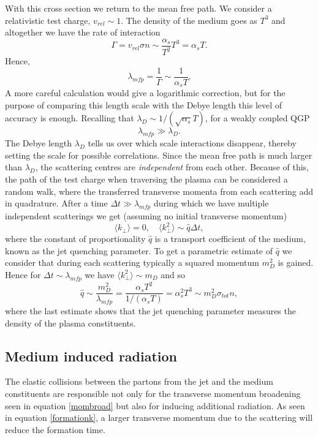 \documentclass[a4paper,12pt]{article}
\numberwithin{equation}{section}
\begin{document}
With this cross section we return to the mean free path. We consider a relativistic test charge, $v_{rel}\sim 1$. The density of the medium goes as $T^3$ and altogether we have the rate of interaction
\begin{equation}
\Gamma = v_{rel}\sigma n \sim \frac{\alpha_s}{T^2}T^3= \alpha_sT.
\end{equation}
Hence,
\begin{equation}
\lambda_{mfp}=\frac{1}{\Gamma}\sim \frac{1}{\alpha_sT}.
\end{equation}
A more careful calculation would give a logarithmic correction, but for the purpose of comparing this length scale with the Debye length this level of accuracy is enough. Recalling that $\lambda_D\sim 1/(\sqrt{\alpha_s}T)$, for a weakly coupled QGP
\begin{equation}
\lambda_{mfp}\gg\lambda_D.
\end{equation}
The Debye length $\lambda_D$ tells us over which scale interactions disappear, thereby setting the scale for possible correlations. Since the mean free path is much larger than $\lambda_D$, the scattering centres are \emph{independent} from each other. Because of this, the path of the test charge when traversing the plasma can be considered a random walk, where the transferred transverse momenta from each scattering add in quadrature. After a time $\Delta t \gg \lambda_{mfp}$ during which we have multiple independent scatterings we get (assuming no initial transverse momentum)
\begin{equation}\label{mombroad}
\langle k_\perp \rangle = 0, \quad \langle k_\perp^2 \rangle \sim \hat{q}\Delta t,
\end{equation}
where the constant of proportionality $\hat{q}$ is a transport coefficient of the medium, known as the jet quenching parameter. To get a parametric estimate of $\hat{q}$ we consider that during each scattering typically a squared momentum $m_D^2$ is gained. Hence for $\Delta t \sim \lambda_{mfp}$ we have $\langle k_\perp^2 \rangle \sim m_D$ and so
\begin{equation}
\hat{q}\sim \frac{m_D^2}{\lambda_{mfp}}=\frac{\alpha_s T^2}{1/(\alpha_s T)}=\alpha_s^2 T^3\sim m_D^2 \sigma_{tot} n,
\end{equation}
where the last estimate shows that the jet quenching parameter measures the density of the plasma constituents.


\subsection{Medium induced radiation}\label{mediuminduced}
The elastic collisions between the partons from the jet and the medium constituents are responsible not only for the transverse momentum broadening seen in equation \eqref{mombroad} but also for inducing additional radiation. As seen in equation \eqref{formationk}, a larger transverse momentum due to the scattering will reduce the formation time.
\end{document}

